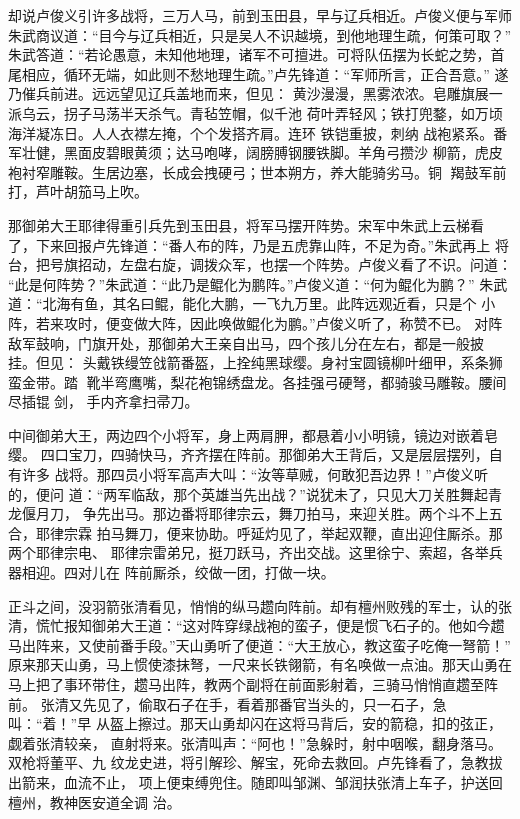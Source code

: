 却说卢俊义引许多战将，三万人马，前到玉田县，早与辽兵相近。卢俊义便与军师
朱武商议道：“目今与辽兵相近，只是吴人不识越境，到他地理生疏，何策可取？”
朱武答道：“若论愚意，未知他地理，诸军不可擅进。可将队伍摆为长蛇之势，首
尾相应，循环无端，如此则不愁地理生疏。”卢先锋道：“军师所言，正合吾意。”
遂乃催兵前进。远远望见辽兵盖地而来，但见：
黄沙漫漫，黑雾浓浓。皂雕旗展一派乌云，拐子马荡半天杀气。青毡笠帽，似千池
荷叶弄轻风；铁打兜鍪，如万顷海洋凝冻日。人人衣襟左掩，个个发搭齐肩。连环
铁铠重披，刺纳
战袍紧系。番军壮健，黑面皮碧眼黄须；达马咆哮，阔膀膊钢腰铁脚。羊角弓攒沙
柳箭，虎皮袍衬窄雕鞍。生居边塞，长成会拽硬弓；世本朔方，养大能骑劣马。铜
羯鼓军前打，芦叶胡笳马上吹。

那御弟大王耶律得重引兵先到玉田县，将军马摆开阵势。宋军中朱武上云梯看
了，下来回报卢先锋道：“番人布的阵，乃是五虎靠山阵，不足为奇。”朱武再上
将台，把号旗招动，左盘右旋，调拨众军，也摆一个阵势。卢俊义看了不识。问道：
“此是何阵势？”朱武道：“此乃是鲲化为鹏阵。”卢俊义道：“何为鲲化为鹏？”
朱武道：“北海有鱼，其名曰鲲，能化大鹏，一飞九万里。此阵远观近看，只是个
小阵，若来攻时，便变做大阵，因此唤做鲲化为鹏。”卢俊义听了，称赞不已。
对阵敌军鼓响，门旗开处，那御弟大王亲自出马，四个孩儿分在左右，都是一般披
挂。但见：
头戴铁缦笠戗箭番盔，上拴纯黑球缨。身衬宝圆镜柳叶细甲，系条狮蛮金带。踏
靴半弯鹰嘴，梨花袍锦绣盘龙。各挂强弓硬弩，都骑骏马雕鞍。腰间尽插锟剑，
手内齐拿扫帚刀。

中间御弟大王，两边四个小将军，身上两肩胛，都悬着小小明镜，镜边对嵌着皂缨。
四口宝刀，四骑快马，齐齐摆在阵前。那御弟大王背后，又是层层摆列，自有许多
战将。那四员小将军高声大叫：“汝等草贼，何敢犯吾边界！”卢俊义听的，便问
道：“两军临敌，那个英雄当先出战？”说犹未了，只见大刀关胜舞起青龙偃月刀，
争先出马。那边番将耶律宗云，舞刀拍马，来迎关胜。两个斗不上五合，耶律宗霖
拍马舞刀，便来协助。呼延灼见了，举起双鞭，直出迎住厮杀。那两个耶律宗电、
耶律宗雷弟兄，挺刀跃马，齐出交战。这里徐宁、索超，各举兵器相迎。四对儿在
阵前厮杀，绞做一团，打做一块。

正斗之间，没羽箭张清看见，悄悄的纵马趱向阵前。却有檀州败残的军士，认的张
清，慌忙报知御弟大王道：“这对阵穿绿战袍的蛮子，便是惯飞石子的。他如今趱
马出阵来，又使前番手段。”天山勇听了便道：“大王放心，教这蛮子吃俺一弩箭！”
原来那天山勇，马上惯使漆抹弩，一尺来长铁翎箭，有名唤做一点油。那天山勇在
马上把了事环带住，趱马出阵，教两个副将在前面影射着，三骑马悄悄直趱至阵前。
张清又先见了，偷取石子在手，看着那番官当头的，只一石子，急叫：“着！”早
从盔上擦过。那天山勇却闪在这将马背后，安的箭稳，扣的弦正，觑着张清较亲，
直射将来。张清叫声：“阿也！”急躲时，射中咽喉，翻身落马。双枪将董平、九
纹龙史进，将引解珍、解宝，死命去救回。卢先锋看了，急教拔出箭来，血流不止，
项上便束缚兜住。随即叫邹渊、邹润扶张清上车子，护送回檀州，教神医安道全调
治。

